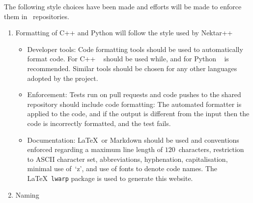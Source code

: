The following style choices have been made and efforts will be made to enforce them
in \nep \ repositories.
\begin{enumerate}
\item Formatting of C++ and Python will follow the style used by Nektar++
\begin{itemize}
\item Developer tools: Code formatting tools should be used to
automatically format code.  For C++ ~\cite{clang-tidywebsite}
should  be used while, and for Python ~\cite{blackwebsite}
is recommended. Similar tools should be chosen
for any other languages adopted by the project.

\item Enforcement: Tests run on pull requests and code pushes to the
shared repository should include code formatting: The automated
formatter is applied to the code, and if the output is different
from the input then the code is incorrectly formatted, and the test
fails.

\item Documentation: \LaTeX \ or Markdown should be used
and conventions enforced regarding a maximum line length of $120$~characters,
restriction to ASCII character set, abbreviations, hyphenation,
capitalisation, minimal use of~`z', and use of fonts to denote code names.
The \LaTeX \ {\tt lwarp} package is used to generate this website.

\end{itemize}

\item Naming 


\end{enumerate}
